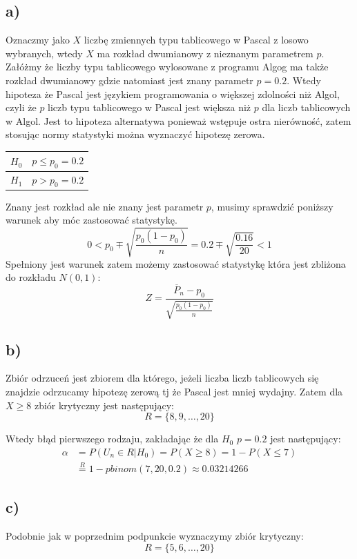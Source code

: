 \documentclass{article}
\begin{document}
\subsection{a)}
Oznaczmy jako $X$ liczbę zmiennych typu tablicowego w Pascal z losowo wybranych, wtedy $X$ ma rozkład dwumianowy z nieznanym parametrem $p$. Załóżmy że liczby typu tablicowego wylosowane z programu Algog ma także rozkład dwumianowy gdzie natomiast jest znany parametr $p = 0.2$. Wtedy hipoteza że Pascal jest językiem programowania o większej zdolności niż Algol, czyli że $p$ liczb typu tablicowego w Pascal jest większa niż $p$ dla liczb tablicowych w Algol. Jest to hipoteza alternatywa ponieważ wstępuje ostra nierówność, zatem stosując normy statystyki można wyznaczyć hipotezę zerowa.
\begin{center} \begin{tabular}{|c|c|} \hline
$H_0$ & $p \leq p_0 = 0.2$ \\ \hline
$H_1$ & $p > p_0 = 0.2$ \\ \hline
\end{tabular} \end{center}

Znany jest rozkład ale nie znany jest parametr $p$, musimy sprawdzić poniższy warunek aby móc zastosować statystykę.
\[ 0 < p_0 \mp \sqrt{\frac{p_0(1-p_0)}{n}} = 0.2 \mp \sqrt{\frac{0.16}{20}} < 1 \]
Spełniony jest warunek zatem możemy zastosować statystykę która jest zbliżona do rozkładu $N(0,1)$:
\[ Z = \frac{\overline{P}_n - p_0}{\sqrt{\frac{p_0(1-p_0)}{n}}} \]

\subsection{b)}
Zbiór odrzuceń jest zbiorem dla którego, jeżeli liczba liczb tablicowych się znajdzie odrzucamy hipotezę zerową tj że Pascal jest mniej wydajny. Zatem dla $X\geq 8$ zbiór krytyczny jest następujący:
\[ R = \{ 8,9,\dots,20 \} \]

Wtedy błąd pierwszego rodzaju, zakładając że dla $H_0$ $p=0.2$ jest następujący:
\begin{align*} \alpha & = P(U_n \in R|H_0) = P(X \geq 8) = 1 - P(X \leq 7) \\
& \overset{R}{=} 1 - pbinom(7, 20, 0.2) \approx 0.03214266 \end{align*}

\subsection{c)}
Podobnie jak w poprzednim podpunkcie wyznaczymy zbiór krytyczny:
\[ R = \{ 5, 6, \dots, 20 \} \]
\end{document}
